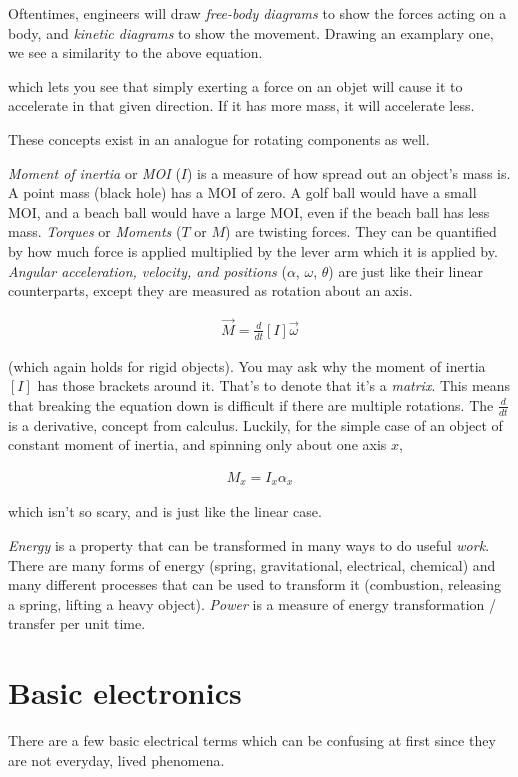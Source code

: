 Oftentimes, engineers will draw \textit{free-body diagrams} to show the forces acting on a body, and \textit{kinetic diagrams} to show the movement. Drawing an examplary one, we see a similarity to the above equation.
 

which lets you see that simply exerting a force on an objet will cause it to accelerate in that given direction. If it has more mass, it will accelerate less.

These concepts exist in an analogue for rotating components as well.

\textit{Moment of inertia} or \textit{MOI} ($I$) is a measure of how spread out an object's mass is. A point mass (black hole) has a MOI of zero. A golf ball would have a small MOI, and a beach ball would have a large MOI, even if the beach ball has less mass.
\textit{Torques} or \textit{Moments} ($T$ or $M$) are twisting forces. They can be quantified by how much force is applied multiplied by the lever arm which it is applied by.
\textit{Angular acceleration, velocity, and positions} ($\alpha$, $\omega$, $\theta$) are just like their linear counterparts, except they are measured as rotation about an axis.

\begin{align}
	\vec{M} = \frac{d}{dt} [I] \vec{\omega}
\end{align}

(which again holds for rigid objects). You may ask why the moment of inertia $[I]$ has those brackets around it. That's to denote that it's a \textit{matrix}. This means that breaking the equation down is difficult if there are multiple rotations. The $\frac{d}{dt}$ is a derivative, concept from calculus. Luckily, for the simple case of an object of constant moment of inertia, and spinning only about one axis $x$,

\begin{align}
	M_x = I_x \alpha_x
\end{align}

which isn't so scary, and is just like the linear case.

\textit{Energy} is a property that can be transformed in many ways to do useful \textit{work}. There are many forms of energy (spring, gravitational, electrical, chemical) and many different processes that can be used to transform it (combustion, releasing a spring, lifting a heavy object).
\textit{Power} is a measure of energy transformation / transfer per unit time.

\section{Basic electronics}
There are a few basic electrical terms which can be confusing at first since they are not everyday, lived phenomena.

